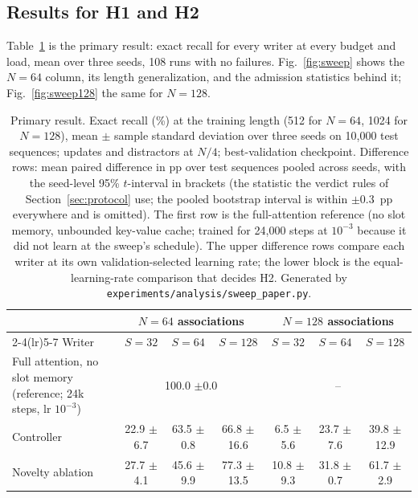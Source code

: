 \documentclass[conference]{IEEEtran}
\begin{document}
\subsection{Results for H1 and H2}
\label{sec:final-results}

Table~\ref{tab:final} is the primary result: exact recall for every writer at
every budget and load, mean over three seeds, 108 runs with no failures.
Fig.~\ref{fig:sweep} shows the $N = 64$ column, its length generalization, and
the admission statistics behind it; Fig.~\ref{fig:sweep128} the same for
$N = 128$.

\begin{table}[t]
\caption{Primary result. Exact recall (\%) at the training length (512 for
$N = 64$, 1024 for $N = 128$), mean $\pm$ sample standard deviation over three
seeds on 10{,}000 test sequences; updates and distractors at $N/4$;
best-validation checkpoint. Difference rows: mean paired difference in pp over
test sequences pooled across seeds, with the seed-level 95\% $t$-interval in
brackets (the statistic the verdict rules of Section~\ref{sec:protocol} use;
the pooled bootstrap interval is within $\pm 0.3$~pp everywhere and is
omitted). The first row is the full-attention reference (no slot memory, unbounded
key-value cache; trained for 24{,}000 steps at $10^{-3}$ because it did not
learn at the sweep's schedule). The upper difference rows compare each writer
at its own validation-selected learning rate; the lower block is the
equal-learning-rate comparison that decides H2. Generated by
\texttt{experiments/analysis/sweep\_paper.py}.}
\label{tab:final}
\centering
\scriptsize
\setlength{\tabcolsep}{3pt}
\begin{tabular}{@{}lcccccc@{}}
\toprule
 & \multicolumn{3}{c}{$N = 64$ associations} & \multicolumn{3}{c}{$N = 128$ associations} \\
\cmidrule(lr){2-4}\cmidrule(lr){5-7}
Writer & $S{=}32$ & $S{=}64$ & $S{=}128$ & $S{=}32$ & $S{=}64$ & $S{=}128$ \\
\midrule
Full attention, no slot memory (reference; 24k steps, lr $10^{-3}$) & \multicolumn{3}{c}{100.0 {\scriptsize$\pm$0.0}} & \multicolumn{3}{c}{--} \\
\midrule
Controller & 22.9 {\scriptsize$\pm$6.7} & 63.5 {\scriptsize$\pm$0.8} & 66.8 {\scriptsize$\pm$16.6} & 6.5 {\scriptsize$\pm$5.6} & 23.7 {\scriptsize$\pm$7.6} & 39.8 {\scriptsize$\pm$12.9} \\
Novelty ablation & 27.7 {\scriptsize$\pm$4.1} & 45.6 {\scriptsize$\pm$9.9} & 77.3 {\scriptsize$\pm$13.5} & 10.8 {\scriptsize$\pm$9.3} & 31.8 {\scriptsize$\pm$0.7} & 61.7 {\scriptsize$\pm$2.9} \\

\end{tabular}
\end{table}
\end{document}
